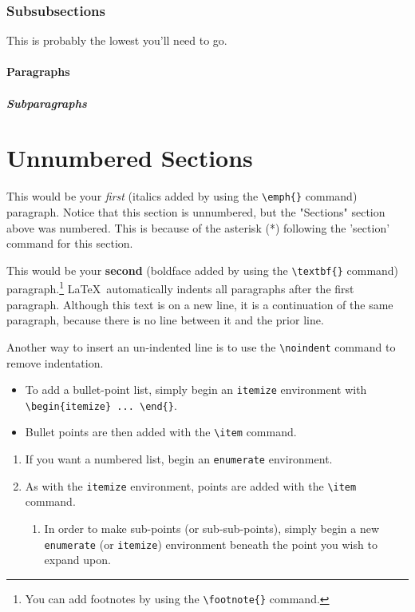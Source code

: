 \documentclass[english,12pt]{article}
\begin{document}
\subsubsection{Subsubsections}
This is probably the lowest you'll need to go.
\paragraph{Paragraphs}
\subparagraph{Subparagraphs}

\section*{Unnumbered Sections}
This would be your  \emph{first} (italics added by using the \texttt{\textbackslash emph\{\}} command) paragraph. Notice that this section is unnumbered, but the "Sections" section above was numbered. This is because of the asterisk (*) following the 'section' command for this section.

This would be your \textbf{second} (boldface added by using the \texttt{\textbackslash textbf\{\}} command) paragraph.\footnote{You can add footnotes by using the \texttt{\textbackslash footnote\{\}} command.} \LaTeX \ automatically indents all paragraphs after the first paragraph. 
Although this text is on a new line, it is a continuation of the same paragraph, because there is no line between it and the prior line.

\noindent Another way to insert an un-indented line is to use the \texttt{\textbackslash noindent} command to remove indentation.

\begin{itemize}
\item To add a bullet-point list, simply begin an \texttt{itemize} environment with \texttt{\textbackslash begin\{itemize\} ... \textbackslash end\{\}}.
\item Bullet points are then added with the \texttt{\textbackslash item} command. 
\end{itemize}

\begin{enumerate}
\item If you want a numbered list, begin an \texttt{enumerate} environment. 
\item As with the \texttt{itemize} environment, points are added with the \texttt{\textbackslash item} command.
  \begin{enumerate}
  \item In order to make sub-points (or sub-sub-points), simply begin a new \texttt{enumerate} (or \texttt{itemize}) environment beneath the point you wish to expand upon.
  \end{enumerate}
\end{enumerate}
\end{document}
